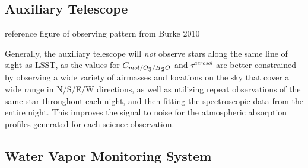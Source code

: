 \documentclass[12pt,preprint]{aastex}
\newcommand{\water}   {H\textsubscript{2}O}
\newcommand{\ozone}    {O\textsubscript{3}}
\begin{document}
\subsection{Auxiliary Telescope}

reference figure of observing pattern from Burke 2010



Generally, the auxiliary telescope will {\it not} observe stars along the
same line of sight as LSST, as the values for
$C_{mol/\ozone/\water}$ and $\tau^{aerosol}$ are better
constrained by observing a wide variety of airmasses and locations on
the sky that cover a wide range in N/S/E/W directions, as well as utilizing
repeat observations of the same star throughout each night, and then
fitting the spectroscopic data from the entire night. This improves the 
signal to noise for the atmospheric absorption profiles generated for each science observation.

%

\subsection{Water Vapor Monitoring System}
\end{document}
